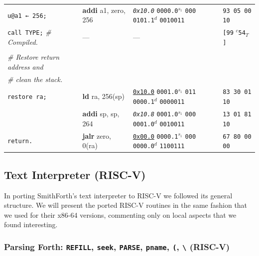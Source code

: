 \documentclass[a4paper,12pt,final]{article}
\begin{document}
\begin{table}[!htbp]
\begin{adjustwidth}{-1cm}{-1cm}
\begin{center}
\begin{tabular}{l|ll|l}
\texttt{u@a1 ← 256;} & \textbf{addi} a1, zero, 256 & \emph{\texttt{0x10.0}}                    \texttt{0000.0}​\(^{s_{1}}\) \texttt{000} \texttt{0101.1}​\(^{d}\)  \texttt{0010011} & \texttt{93 05 00 10}\\[0pt]
\texttt{call TYPE;}  \emph{\# Compiled.} & --- & --- & \texttt{[99} \(^{c}\)​\texttt{54}​\(_{T}\)​\texttt{]}\\[0pt]
 &  &  & \\[0pt]
\emph{\# Restore return address and} &  &  & \\[0pt]
\emph{\# clean the stack.} &  &  & \\[0pt]
\texttt{restore ra;} & \textbf{ld} ra, 256(sp) & \uline{\texttt{0x10.0}}                    \texttt{0001.0}​\(^{s_{1}}\) \texttt{011} \texttt{0000.1}​\(^{d}\)  \texttt{0000011} & \texttt{83 30 01 10}\\[0pt]
 & \textbf{addi} sp, sp, 264 & \emph{\texttt{0x10.8}}                    \texttt{0001.0}​\(^{s_{1}}\) \texttt{000} \texttt{0001.0}​\(^{d}\)  \texttt{0010011} & \texttt{13 01 81 10}\\[0pt]
\texttt{return.} & \textbf{jalr} zero, 0(ra) & \uline{\texttt{0x00.0}}                    \texttt{0000.1}​\(^{s_{1}}\) \texttt{000} \texttt{0000.0}​\(^{d}\)  \texttt{1100111} & \texttt{67 80 00 00}\\[0pt]
\end{tabular}

\end{center}
\normalsize \end{adjustwidth} \end{table} \vspace{0}
\clearpage


\subsection{Text Interpreter (RISC-V)}
\label{sec:org7326c3d}

In porting SmithForth's text interpreter to RISC-V we followed its
general structure.  We will present the ported RISC-V routines in the
same fashion that we used for their x86-64 versions, commenting only
on local aspects that we found interesting.

\subsubsection{Parsing Forth: \texttt{REFILL}, \texttt{seek}, \texttt{PARSE}, \texttt{pname}, \texttt{(}, \texttt{\textbackslash{}} (RISC-V)}
\label{sec:org399825d}
\end{document}

